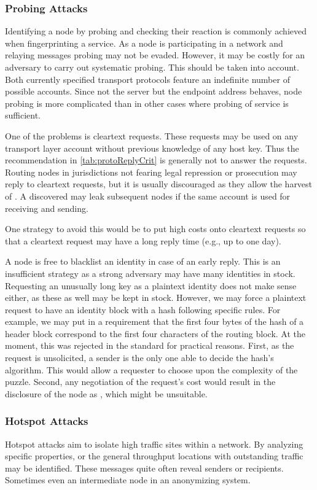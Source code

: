\subsubsection{Probing Attacks}
Identifying a node by probing and checking their reaction is commonly achieved when fingerprinting a service. As a node is participating in a network and relaying messages probing may not be evaded. However, it may be costly for an adversary to carry out systematic probing. This should be taken into account. Both currently specified transport protocols feature an indefinite number of possible accounts. Since not the server but the endpoint address behaves, node probing is more complicated than in other cases where probing of service is sufficient. 

One of the problems is cleartext requests. These requests may be used on any transport layer account without previous knowledge of any host key. Thus the recommendation in \cref{tab:protoReplyCrit} is generally not to answer the requests. Routing nodes in jurisdictions not fearing legal repression or prosecution may reply to cleartext requests, but it is usually discouraged as they allow the harvest of \VortexNodes{}. A discovered \VortexNode{} may leak subsequent nodes if the same account is used for receiving and sending.

One strategy to avoid this would be to put high costs onto cleartext requests so that a cleartext request may have a long reply time (e.g., up to one day). 

A node is free to blacklist an identity in case of an early reply. This is an insufficient strategy as a strong adversary may have many identities in stock. Requesting an unusually long key as a plaintext identity does not make sense either, as these as well may be kept in stock. However, we may force a plaintext request to have an identity block with a hash following specific rules. For example, we may put in a requirement that the first four bytes of the hash of a header block correspond to the first four characters of the routing block. At the moment, this was rejected in the standard for practical reasons. First, as the request is unsolicited, a sender is the only one able to decide the hash's algorithm. This would allow a requester to choose upon the complexity of the puzzle. Second, any negotiation of the request's cost would result in the disclosure of the node as \VortexNode, which might be unsuitable.

\subsubsection{Hotspot Attacks}
Hotspot attacks aim to isolate high traffic sites within a network. By analyzing specific properties, or the general throughput locations with outstanding traffic may be identified. These messages quite often reveal senders or recipients. Sometimes even an intermediate node in an anonymizing system. 


